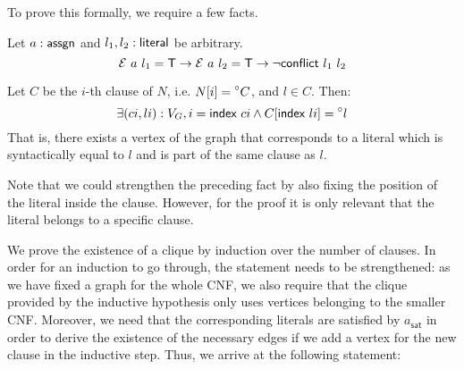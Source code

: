 To prove this formally, we require a few facts. 
\begin{fact}\label{fact:literal_conflict}
  Let $a : \textsf{assgn}$ and $l_1, l_2 : \textsf{literal}$ be arbitrary. 
  \[\mathcal{E}~a~l_1 = \mathsf{T} \rightarrow \mathcal{E}~a~l_2 = \mathsf{T} \rightarrow \lnot \textsf{conflict}{}~l_1~l_2 \]
\end{fact}

\begin{fact}\label{fact:litInClause_exists_vertex}
  Let $C$ be the $i$-th clause of $N$, i.e. $N[i] = \prescript{\circ}{}C$, and $l \in C$. Then:
  \[\exists (ci,li) : V_G, i = \textsf{index}~ci \land C[\textsf{index}~li] = \prescript{\circ}{}l\]
  That is, there exists a vertex of the graph that corresponds to a literal which is syntactically equal to $l$ and is part of the same clause as $l$.
\end{fact}
Note that we could strengthen the preceding fact by also fixing the position of the literal inside the clause. However, for the proof it is only relevant that the literal belongs to a specific clause.

We prove the existence of a clique by induction over the number of clauses. In order for an induction to go through, the statement needs to be strengthened: as we have fixed a graph for the whole CNF, we also require that the clique provided by the inductive hypothesis only uses vertices belonging to the smaller CNF. Moreover, we need that the corresponding literals are satisfied by $a_{\textsf{sat}}$ in order to derive the existence of the necessary edges if we add a vertex for the new clause in the inductive step. Thus, we arrive at the following statement:

